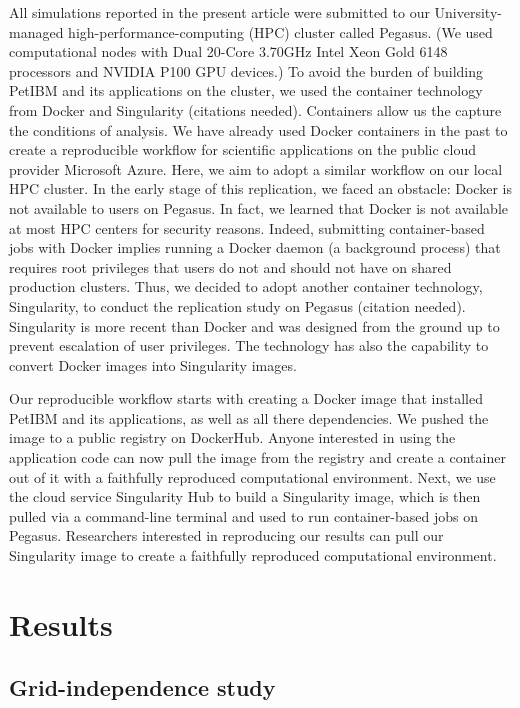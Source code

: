 All simulations reported in the present article were submitted to our University-managed high-performance-computing (HPC) cluster called Pegasus.
(We used computational nodes with Dual 20-Core 3.70GHz Intel Xeon Gold 6148 processors and NVIDIA P100 GPU devices.)
To avoid the burden of building PetIBM and its applications on the cluster, we used the container technology from Docker and Singularity (citations needed).
Containers allow us the capture the conditions of analysis.
We have already used Docker containers in the past to create a reproducible workflow for scientific applications on the public cloud provider Microsoft Azure.\supercite{mesnard_barba_2020}
Here, we aim to adopt a similar workflow on our local HPC cluster.
In the early stage of this replication, we faced an obstacle: Docker is not available to users on Pegasus.
In fact, we learned that Docker is not available at most HPC centers for security reasons.
Indeed, submitting container-based jobs with Docker implies running a Docker daemon (a background process) that requires root privileges that users do not and should not have on shared production clusters.
Thus, we decided to adopt another container technology, Singularity, to conduct the replication study on Pegasus (citation needed).
Singularity is more recent than Docker and was designed from the ground up to prevent escalation of user privileges.
The technology has also the capability to convert Docker images into Singularity images.

Our reproducible workflow starts with creating a Docker image that installed PetIBM and its applications, as well as all there dependencies.
We pushed the image to a public registry on DockerHub.
Anyone interested in using the application code can now pull the image from the registry and create a container out of it with a faithfully reproduced computational environment.
Next, we use the cloud service Singularity Hub to build a Singularity image, which is then pulled via a command-line terminal and used to run container-based jobs on Pegasus.
Researchers interested in reproducing our results can pull our Singularity image to create a faithfully reproduced computational environment.

\section{Results}

\subsection{Grid-independence study}

